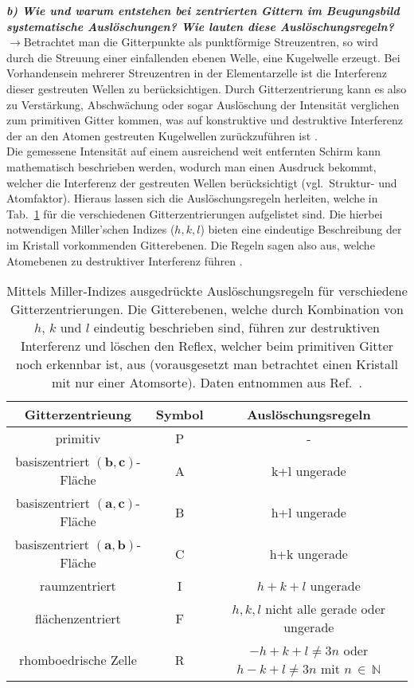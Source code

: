 \textbf{\textit{b) Wie und warum entstehen bei zentrierten Gittern im Beugungsbild 
systematische Auslöschungen? Wie lauten diese Auslöschungsregeln?}}\\
$\rightarrow$Betrachtet man die Gitterpunkte als punktförmige Streuzentren, so wird durch die Streuung einer einfallenden ebenen Welle, 
eine Kugelwelle erzeugt. Bei Vorhandensein mehrerer Streuzentren in der Elementarzelle ist die Interferenz dieser gestreuten Wellen 
zu berücksichtigen. Durch Gitterzentrierung kann es also zu Verstärkung, Abschwächung oder sogar Auslöschung der Intensität verglichen
zum primitiven Gitter kommen, was auf konstruktive und destruktive Interferenz der an den Atomen gestreuten Kugelwellen zurückzuführen ist \cite{EPC}. \\ 
Die gemessene Intensität auf einem ausreichend weit entfernten Schirm kann mathematisch beschrieben werden, wodurch man einen 
Ausdruck bekommt, welcher die Interferenz der gestreuten Wellen berücksichtigt (vgl.~Struktur- und Atomfaktor). 
Hieraus lassen sich die Auslöschungsregeln herleiten, welche in Tab.~\ref{tab:reflex} für 
die verschiedenen Gitterzentrierungen aufgelistet sind. Die hierbei notwendigen Miller'schen Indizes ($h, k, l$) bieten eine eindeutige Beschreibung 
der im Kristall vorkommenden Gitterebenen. Die Regeln sagen also aus, welche Atomebenen zu destruktiver Interferenz führen \cite{Schwarz}.
\begin{table}[h!]
    \centering
    \caption{\label{tab:reflex}Mittels Miller-Indizes ausgedrückte Auslöschungsregeln für verschiedene Gitterzentrierungen. 
    Die Gitterebenen, welche durch Kombination von $h$, $k$ und $l$ eindeutig beschrieben sind, führen zur destruktiven Interferenz und löschen den Reflex, 
    welcher beim primitiven Gitter noch erkennbar ist, aus (vorausgesetzt man betrachtet einen Kristall mit nur einer Atomsorte).
    Daten entnommen aus Ref.~\cite{Schwarz}.}
      \begin{tabular}{c|c|c}
      \rowcolor[rgb]{ .851,  .882,  .949} Gitterzentrieung & Symbol & Auslöschungsregeln \\
      \midrule
      \midrule
      primitiv & P     & - \\
      basiszentriert $(\mathbf{b},\mathbf{c})$-Fläche & A     & k+l ungerade \\
      basiszentriert $(\mathbf{a},\mathbf{c})$-Fläche & B     & h+l ungerade \\
      basiszentriert $(\mathbf{a},\mathbf{b})$-Fläche & C     & h+k ungerade \\
      raumzentriert & I     & $h+k+l$ ungerade \\
      flächenzentriert & F     & $h,k,l$ nicht alle gerade oder ungerade \\
      rhomboedrische Zelle & R     & $-h+k+l\neq 3n$ oder $h-k+l\neq 3n$ mit $n\,\in\,\mathbb{N}$ \\
      \end{tabular}
\end{table}\FloatBarrier
  